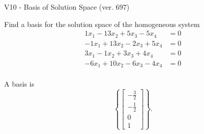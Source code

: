 \begin{exercise}
  \begin{exerciseTitle}V10 - Basis of Solution Space (ver. 697)\end{exerciseTitle}
  \begin{exerciseStatement}
    Find a basis for the solution space of the homogeneous system 
\begin{align*}
 1 x_ 1 -13 x_ 2 + 5 x_ 3 -5 x_ 4 &= 0  \\ 
  -1 x_ 1 + 13 x_ 2 -2 x_ 3 + 5 x_ 4 &= 0  \\ 
  3 x_ 1 -1 x_ 2 + 3 x_ 3 + 4 x_ 4 &= 0  \\ 
  -6 x_ 1 + 10 x_ 2 -6 x_ 3 -4 x_ 4 &= 0  \\ 
 \end{align*}


 
  \end{exerciseStatement}

  \begin{exerciseAnswer}
   A basis is   
\[\left\{\left[\begin{array}{c}
-\frac{3}{2} \\
-\frac{1}{2} \\
0 \\
1
\end{array}\right]\right\}.\]

  


  \end{exerciseAnswer}
\end{exercise}